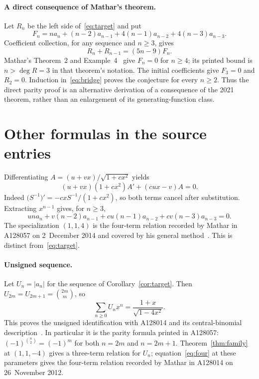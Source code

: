 \documentclass[11pt]{article}
\begin{document}
\paragraph{A direct consequence of Mathar's theorem.}
Let $R_n$ be the left side of~\eqref{eq:target} and put
\[
 F_n=na_n+(n-2)a_{n-1}+4(n-1)a_{n-2}+4(n-3)a_{n-3}.
\]
Coefficient collection, for any sequence and $n\geq3$, gives
\begin{equation}\label{eq:bridge}
 R_n+R_{n-1}=(5n-9)F_n.
\end{equation}
Mathar's Theorem~2 and Example~4~\cite{mathar} give $F_n=0$ for
$n\geq4$; its printed bound is $n>\deg R=3$ in that theorem's notation.
The initial coefficients give $F_3=0$ and $R_2=0$.
Induction in~\eqref{eq:bridge} proves the conjecture for every $n\geq2$.
Thus the direct parity proof is an alternative derivation of a consequence
of the 2021 theorem, rather than an enlargement of its generating-function class.

\section{Other formulas in the source entries}
Differentiating $A=(u+vx)/\sqrt{1+cx^2}$ yields
\begin{equation}\label{eq:firstorder}
 (u+vx)(1+cx^2)A'+(cux-v)A=0.
\end{equation}
Indeed $\bigl(S^{-1}\bigr)'=-cxS^{-1}/(1+cx^2)$, so both terms cancel
after substitution. Extracting $x^{n-1}$ gives, for $n\geq3$,
\begin{equation}\label{eq:four}
 un a_n+v(n-2)a_{n-1}+cu(n-1)a_{n-2}+cv(n-3)a_{n-3}=0.
\end{equation}
The specialization $(1,1,4)$ is the four-term relation recorded by
Mathar in A128057 on 2~December 2014 and covered by his general
method~\cite{a128057,mathar}. This is distinct from~\eqref{eq:target}.

\paragraph{Unsigned sequence.}
Let $U_n=|a_n|$ for the sequence of Corollary~\ref{cor:target}.
Then $U_{2m}=U_{2m+1}=\binom{2m}{m}$, so
\[
 \sum_{n\geq0}U_nx^n=\frac{1+x}{\sqrt{1-4x^2}}.
\]
This proves the unsigned identification with A128014 and its
central-binomial description~\cite{a128014,a000984}. In particular it is
the parity formula printed in A128057: $(-1)^{\binom n2}=(-1)^m$
for both $n=2m$ and $n=2m+1$.
Theorem~\ref{thm:family} at $(1,1,-4)$ gives a three-term relation for
$U_n$; equation~\eqref{eq:four} at these parameters gives the four-term
relation recorded by Mathar in A128014 on 26~November 2012.
\end{document}
